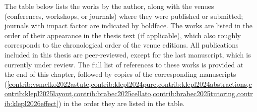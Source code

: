 \label{chap:publist}

The table below lists the works by the author, along with the venues (conferences, workshops, or journals) where they were published or submitted; journals with impact factor are indicated by boldface. The works are listed in the order of their appearance in the thesis text (if applicable), which also roughly corresponds to the chronological order of the venue editions. All publications included in this thesis are peer-reviewed, except for the last manuscript, which is currently under review. The full list of references to these works is provided at the end of this chapter, followed by copies of the corresponding manuscripts (\cref{contrib:vsmelko2022astute,contrib:klepl2024pure,contrib:klepl2024abstractions,contrib:klepl2025layout,contrib:brabec2025cellato,contrib:brabec2025tutoring,contrib:klepl2026effect}) in the order they are listed in the table.

